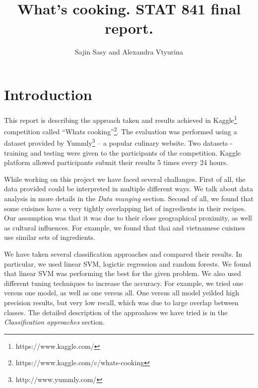 \documentclass[prodmode,acmtap]{acmlarge}
\title{What's cooking. STAT 841 final report.}
\author{Sajin Sasy and Alexandra Vtyurina \affil{University of Waterloo}
}
\begin{document}


\maketitle

\section{Introduction}
This report is describing the approach taken and results achieved in Kaggle\footnote{https://www.kaggle.com/} competition called ``What\textquotesingle s cooking''\footnote{https://www.kaggle.com/c/whats-cooking}. The evaluation was performed using a dataset provided by Yummly\footnote{http://www.yummly.com/} -- a popular culinary website. Two datasets - training and testing were given to the participants of the competition. Kaggle platform allowed participants submit their results 5 times every 24 hours. 

While working on this project we have faced several challanges. First of all, the data provided could be interpreted in multiple different ways. We talk about data analysis in more details in the \textit{Data munging} section. Second of all, we found that some cuisines have a very tightly overlapping list of ingredients in their recipes. Our assumption was that it was due to their close geographical proximity, as well as cultural influences. For example, we found that thai and vietnamese cuisines use similar sets of ingredients. 

We have taken several classification approaches and compared their results. In particular, we used linear SVM, logictic regression and random forests. We found that linear SVM was performing the best for the given problem. We also used different tuning techniques to increase the accuracy. For example, we tried one versus one model, as well as one versus all. One versus all model yeilded high precision results, but very low recall, which was due to large overlap between classes. The detailed description of the approahces we have tried is in the \textit{Classification approaches} section. 
\end{document}
